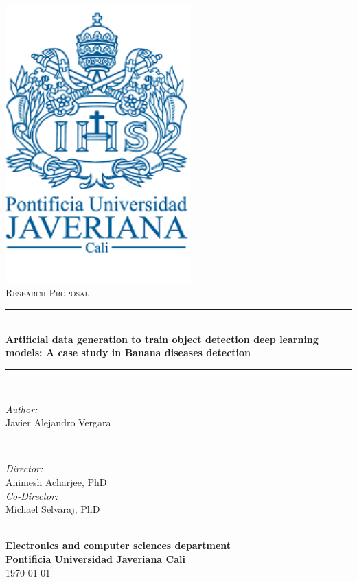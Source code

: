 \documentclass[oneside]{book}
\begin{document}
\frontmatter	  %

\begin{titlepage}

\newcommand{\HRule}{\rule{\linewidth}{0.5mm}} 

\center 

\includegraphics[scale=0.7]{Figures/logo_javeriana.pdf}\\[1cm] 

\textsc{\Large Research Proposal}\\[0.5cm] 

\HRule \\[0.4cm]
{ \huge \bfseries Artificial data generation to train object detection deep learning models: A case study in Banana diseases detection}\\[0.4cm] 
\HRule \\[1.5cm]

\begin{minipage}{0.4\textwidth}
\begin{flushleft} \large
\emph{Author:}\\
Javier Alejandro Vergara
\end{flushleft}
\end{minipage}
~
\begin{minipage}{0.4\textwidth}
\begin{flushright} \large
\emph{Director:} \\
Animesh Acharjee, PhD\\ 
\emph{Co-Director:} \\
Michael Selvaraj, PhD 
\end{flushright}

\end{minipage}\\[2cm]
\textbf{ Electronics and computer sciences
department}\\
\textbf{Pontificia Universidad Javeriana Cali}
\\
\vspace{5mm} %
{\large \today}\\[2cm] 

\vfill 

\end{titlepage}
\end{document}
